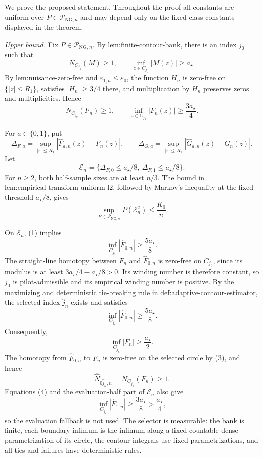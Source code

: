 We prove the proposed statement.  Throughout the proof all constants are
uniform over \(P\in\mathcal P_{\mathrm{NG},n}\) and may depend only on the
fixed class constants displayed in the theorem.

\emph{Upper bound.}
Fix \(P\in\mathcal P_{\mathrm{NG},n}\).  By
\(\text{lem:finite-contour-bank}\), there is an index \(j_0\) such that
\[
 N_{C_{j_0}}(M)\ge1,
 \qquad
 \inf_{z\in C_{j_0}}|M(z)|\ge a_{\star}.
\]
By \(\text{lem:nuisance-zero-free}\) and
\(\varepsilon_{1,n}\le\varepsilon_0\), the function \(H_n\) is zero-free
on \(\{|z|\le R_1\}\), satisfies \(|H_n|\ge3/4\) there, and multiplication
by \(H_n\) preserves zeros and multiplicities.  Hence
\[
 N_{C_{j_0}}(F_n)\ge1,
 \qquad
 \inf_{z\in C_{j_0}}|F_n(z)|\ge\frac{3a_{\star}}4.       \tag{1}
\]

For \(a\in\{0,1\}\), put
\[
 \Delta_{F,a}=\sup_{|z|\le R_1}
   |\widehat F_{a,n}(z)-F_n(z)|,
 \qquad
 \Delta_{G,a}=\sup_{|z|\le R_1}
   |\widehat G_{a,n}(z)-G_n(z)|.
\]
Let
\[
 \mathcal E_n=
 \{\Delta_{F,0}\le a_{\star}/8,\ 
   \Delta_{F,1}\le a_{\star}/8\}.
\]
For \(n\ge2\), both half-sample sizes are at least \(n/3\).
The bound in \(\text{lem:empirical-transform-uniform-l2}\), followed by
Markov's inequality at the fixed threshold \(a_{\star}/8\), gives
\[
 \sup_{P\in\mathcal P_{\mathrm{NG},n}}P(\mathcal E_n^c)
 \le \frac{K_0}{n}.                                    \tag{2}
\]

On \(\mathcal E_n\), (1) implies
\[
 \inf_{C_{j_0}}|\widehat F_{0,n}|
 \ge\frac{5a_{\star}}8.
\]
The straight-line homotopy between \(F_n\) and
\(\widehat F_{0,n}\) is zero-free on \(C_{j_0}\), since its modulus is
at least \(3a_{\star}/4-a_{\star}/8>0\).  Its winding number is therefore
constant, so \(j_0\) is pilot-admissible and its empirical winding number
is positive.  By the maximizing and deterministic tie-breaking rule in
\(\text{def:adaptive-contour-estimator}\), the selected index
\(\widehat j_n\) exists and satisfies
\[
 \inf_{C_{\widehat j_n}}|\widehat F_{0,n}|
 \ge\frac{5a_{\star}}8.                                 \tag{3}
\]
Consequently,
\[
 \inf_{C_{\widehat j_n}}|F_n|
 \ge\frac{a_{\star}}2.                                  \tag{4}
\]
The homotopy from \(\widehat F_{0,n}\) to \(F_n\) is zero-free on the
selected circle by (3), and hence
\[
 \widehat N_{0\widehat j_n,n}
 =N_{C_{\widehat j_n}}(F_n)\ge1.                        \tag{5}
\]
Equations (4) and the evaluation-half part of \(\mathcal E_n\) also give
\[
 \inf_{C_{\widehat j_n}}|\widehat F_{1,n}|
 \ge\frac{3a_{\star}}8>\frac{a_{\star}}4,              \tag{6}
\]
so the evaluation fallback is not used.  The selector is measurable:
the bank is finite, each boundary infimum is the infimum along a fixed
countable dense parametrization of its circle, the contour integrals use
fixed parametrizations, and all ties and failures have deterministic
rules.

